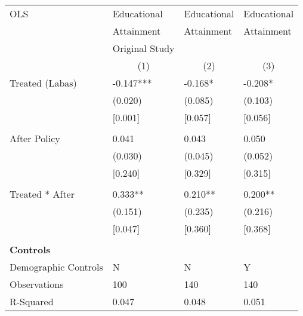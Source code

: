 \begin{tabular}{p{4cm}p{1.5cm}p{1.5cm}p{1.5cm}}
\hline\hline
OLS               &Educational & Educational &Educational \\
&Attainment &Attainment &Attainment \\
&Original Study & &  \\
&\multicolumn{1}{c}{(1)}&\multicolumn{1}{c}{(2)}&\multicolumn{1}{c}{(3)}\\
\hline
Treated (Labas)   &  -0.147***&   -0.168* & -0.208* \\
                &  (0.020)&  (0.085) & (0.103)\\
									& [0.001]	 &  [0.057]&  [0.056]\\										
                \\
After Policy   &   0.041&   0.043 &0.050\\
                &  (0.030)&  (0.045) & (0.052)\\
									& [0.240]	 &  [0.329]&  [0.315]\\										
                \\
Treated * After   &  0.333**&  0.210** & 0.200**\\
                &  (0.151)&  (0.235) &(0.216)\\
									& [0.047]	 &  [0.360]&  [0.368]\\										
                \\

\multicolumn{4}{l}{\textbf{Controls}}  \\                  
Demographic Controls       &    N    &       N&        Y\\

\hline
Observations    &    100&    140 & 140\\
R-Squared    &  0.047   & 0.048 & 0.051     \\
\hline\hline
\end{tabular}